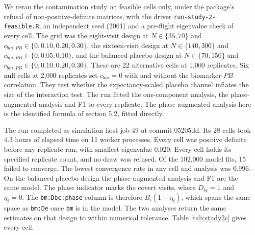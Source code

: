 \documentclass[
  11pt,
]{article}
\begin{document}
We reran the contamination study on feasible cells only, under the
package's refusal of non-positive-definite matrices, with the driver
\texttt{run-study-2-feasible.R}, an independent seed (2061) and a
pre-flight eigenvalue check of every cell. The grid was the eight-visit
design at \(N \in \{35, 70\}\) and \(c_{bm,PB} \in \{0, 0.10, 0.20, 0.30\}\),
the sixteen-visit design at \(N \in \{140, 300\}\) and \(c_{bm,PB} \in \{0,
0.05, 0.10\}\), and the balanced-placebo design at \(N \in \{70, 150\}\) and
\(c_{bm,PB} \in \{0, 0.10, 0.20, 0.30\}\). These are 22 alternative cells
at 1,000 replicates. Six null cells at 2,000 replicates set \(c_{bm} = 0\)
with and without the biomarker-\(PB\) correlation. They test whether the
expectancy-scaled placebo channel inflates the size of the interaction
test. The run fitted the one-component analysis, the phase-augmented
analysis and F1 to every replicate. The phase-augmented analysis here is
the identified formula of section 5.2, fitted directly.

The run completed as simulation-host job 49 at commit 05205dd. Its 28
cells took 4.3 hours of elapsed time on
11 worker processes. Every cell was positive
definite before any replicate ran, with smallest eigenvalue
0.020. Every cell holds its specified replicate
count, and no draw was refused. Of the
102,000 model fits,
15 failed to converge. The lowest convergence rate in any cell
and analysis was 0.996. On the balanced-placebo
design the phase-augmented analysis and F1 are the same model. The
phase indicator marks the covert visits, where \(D_{bc} = 1\) and
\(\eta_t = 0\). The \texttt{bm:Dbc:phase} column is therefore \(B_i(1 -
\eta_t)\), which spans the same space as \texttt{bm:De} once \texttt{bm}
is in the model. The two analyses return the same estimates on that
design to within numerical tolerance. Table \ref{tab:study2c} gives
every cell.

\begingroup\fontsize{7}{9}\selectfont
\end{document}
